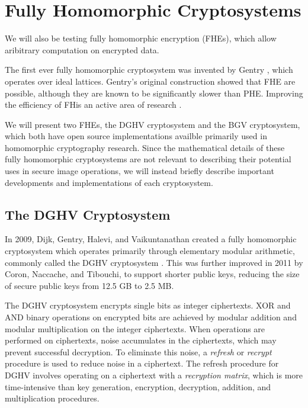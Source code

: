 \section{Fully Homomorphic Cryptosystems}

We will also be testing fully homomorphic encryption (FHEs), which allow aribitrary computation on encrypted data.

The first ever fully homomorphic cryptosystem was invented by Gentry \cite{gentry_fully_2009}, which operates over ideal lattices. Gentry's original construction showed that FHE are possible, although they are known to be significantly slower than PHE. 
Improving the efficiency of FHis an active area of research \cite{sen_homomorphic_2013}. 

We will present two FHEs, the DGHV cryptosystem and the BGV cryptosystem, which both have open source implementations availble primarily used in homomorphic cryptography research. Since the mathematical details of these fully homomorphic cryptosystems are not relevant to describing their potential uses in secure image operations, we will instead briefly describe important developments and implementations of each cryptosystem.

\subsection{The DGHV Cryptosystem}
In 2009, Dijk, Gentry, Halevi, and Vaikuntanathan created a fully homomorphic cryptosystem which operates primarily through elementary modular arithmetic, commonly called the DGHV cryptosystem \cite{cryptoeprint:2009:616}. This was further improved in 2011 by Coron, Naccache, and Tibouchi, \cite{cryptoeprint:2011:277, cryptoeprint:2011:440} to support shorter public keys, reducing the size of secure public keys from 12.5 GB to 2.5 MB. 

The DGHV cryptosystem encrypts single bits as integer ciphertexts. XOR and AND binary operations on encrypted bits are achieved by modular addition and modular multiplication on the integer ciphertexts. When operations are performed on ciphertexts, noise accumulates in the ciphertexts, which may prevent successful decryption. To eliminate this noise, a \textit{refresh} or \textit{recrypt} procedure is used to reduce noise in a ciphertext. The refresh procedure for DGHV involves operating on a ciphertext with a \textit{recryption matrix}, which is more time-intensive than key generation, encryption, decryption, addition, and multiplication procedures.

